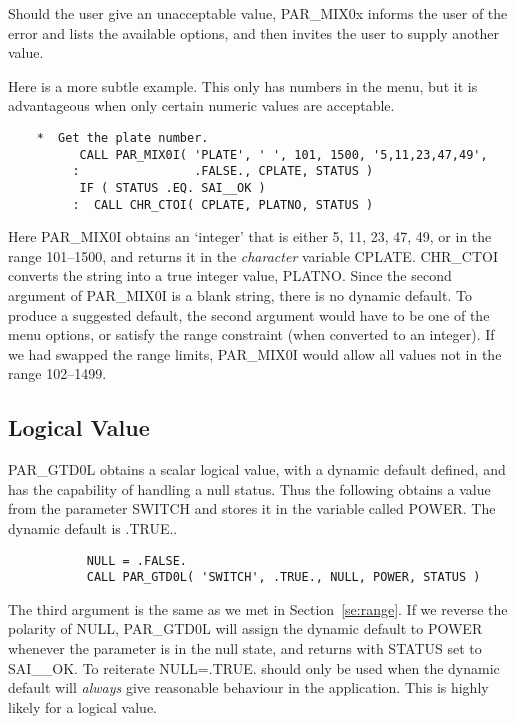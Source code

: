 \documentclass[twoside,11pt]{article}
\newcommand{\xlabel}[1]{}
\newcommand{\dash}{--}
\newcommand{\dash}{-}
\begin{document}
Should the user give an unacceptable value, PAR\_MIX0x informs the user
of the error and lists the available options, and then invites the user
to supply another value. 

Here is a more subtle example.  This only has numbers in the menu, but
it is advantageous when only certain numeric values are acceptable.
\begin{verbatim}
    *  Get the plate number.
          CALL PAR_MIX0I( 'PLATE', ' ', 101, 1500, '5,11,23,47,49',
         :                .FALSE., CPLATE, STATUS )
          IF ( STATUS .EQ. SAI__OK ) 
         :  CALL CHR_CTOI( CPLATE, PLATNO, STATUS )
\end{verbatim}

Here PAR\_MIX0I obtains an `integer' that is either 5, 11, 23, 47, 49,
or in the range 101\dash1500, and returns it in the {\em character\/}
variable CPLATE.  CHR\_CTOI converts the string into a true integer
value, PLATNO.  Since the second argument of PAR\_MIX0I is a blank
string, there is no dynamic default.  To produce a suggested default,
the second argument would have to be one of the menu options, or satisfy
the range constraint (when converted to an integer). If we had swapped
the range limits, PAR\_MIX0I would allow all values not in the range
102\dash1499. 

\subsection{\xlabel{logical_value}Logical Value}

PAR\_GTD0L obtains a scalar logical value, with a dynamic default
defined, and has the capability of handling a null status.  Thus the
following obtains a value from the parameter SWITCH and stores it in the
variable called POWER.  The dynamic default is .TRUE..

\begin{verbatim}
           NULL = .FALSE.
           CALL PAR_GTD0L( 'SWITCH', .TRUE., NULL, POWER, STATUS )
\end{verbatim}

The third argument is the same as we met in Section~\ref{se:range}. If
we reverse the polarity of NULL, PAR\_GTD0L will assign the dynamic
default to POWER whenever the parameter is in the null state, and
returns with STATUS set to SAI\_\_OK.  To reiterate NULL=.TRUE. should
only be used when the dynamic default will {\em always\/} give
reasonable behaviour in the application.  This is highly likely for a
logical value. 
\end{document}
